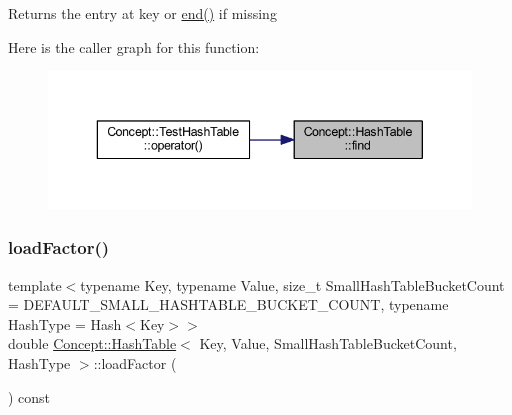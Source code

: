 \begin{DoxyReturn}{Returns}
the entry at key or \mbox{\hyperlink{class_concept_1_1_hash_table_a4621e02c1fedb16e29a88ae0b517ffd2}{end()}} if missing 
\end{DoxyReturn}
Here is the caller graph for this function\+:\nopagebreak
\begin{figure}[H]
\begin{center}
\leavevmode
\includegraphics[width=343pt]{class_concept_1_1_hash_table_acaa2106cab7de32f3a6467b023d04773_icgraph}
\end{center}
\end{figure}
\mbox{\label{class_concept_1_1_hash_table_a6211e9857610c29fb0665177e3d365e8}} 
\subsubsection{\texorpdfstring{loadFactor()}{loadFactor()}}
{\footnotesize\ttfamily template$<$typename Key, typename Value, size\+\_\+t Small\+Hash\+Table\+Bucket\+Count = D\+E\+F\+A\+U\+L\+T\+\_\+\+S\+M\+A\+L\+L\+\_\+\+H\+A\+S\+H\+T\+A\+B\+L\+E\+\_\+\+B\+U\+C\+K\+E\+T\+\_\+\+C\+O\+U\+NT, typename Hash\+Type = Hash$<$\+Key$>$$>$ \\
double \mbox{\hyperlink{class_concept_1_1_hash_table}{Concept\+::\+Hash\+Table}}$<$ Key, Value, Small\+Hash\+Table\+Bucket\+Count, Hash\+Type $>$\+::load\+Factor (\begin{DoxyParamCaption}{ }\end{DoxyParamCaption}) const\hspace{0.3cm}{\ttfamily [inline]}}

